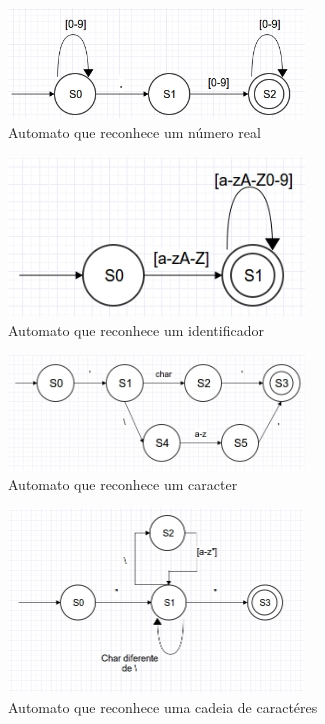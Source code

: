 \begin{figure}[H]
  \caption{Automato que reconhece um número real}
  \centering
    \includegraphics[width=0.7\textwidth]{../0-lexico/automatos/float}
\end{figure}

\begin{figure}[H]
  \caption{Automato que reconhece um identificador}
  \centering
    \includegraphics[width=0.7\textwidth]{../0-lexico/automatos/keyword_identifier}
\end{figure}

\begin{figure}[H]
  \caption{Automato que reconhece um caracter}
  \centering
    \includegraphics[width=0.7\textwidth]{../0-lexico/automatos/char}
\end{figure}

\begin{figure}[H]
  \caption{Automato que reconhece uma cadeia de caractéres}
  \centering
    \includegraphics[width=0.7\textwidth]{../0-lexico/automatos/string}
\end{figure}

